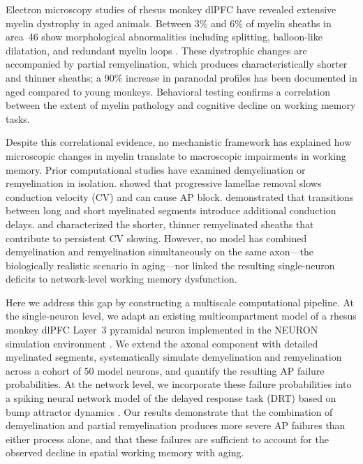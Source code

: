 \documentclass[11pt]{article}
\begin{document}
Electron microscopy studies of rhesus monkey dlPFC have revealed extensive myelin dystrophy in aged animals. Between 3\% and 6\% of myelin sheaths in area~46 show morphological abnormalities including splitting, balloon-like dilatation, and redundant myelin loops \citep{peters2009,bowley2010}. These dystrophic changes are accompanied by partial remyelination, which produces characteristically shorter and thinner sheaths; a 90\% increase in paranodal profiles has been documented in aged compared to young monkeys. Behavioral testing confirms a correlation between the extent of myelin pathology and cognitive decline on working memory tasks.

Despite this correlational evidence, no mechanistic framework has explained how microscopic changes in myelin translate to macroscopic impairments in working memory. Prior computational studies have examined demyelination or remyelination in isolation. \citet{stephanova2005} showed that progressive lamellae removal slows conduction velocity (CV) and can cause AP block. \citet{scurfield2018} demonstrated that transitions between long and short myelinated segments introduce additional conduction delays. \citet{lasiene2008} and \citet{powers2012} characterized the shorter, thinner remyelinated sheaths that contribute to persistent CV slowing. However, no model has combined demyelination and remyelination simultaneously on the same axon---the biologically realistic scenario in aging---nor linked the resulting single-neuron deficits to network-level working memory dysfunction.

Here we address this gap by constructing a multiscale computational pipeline. At the single-neuron level, we adapt an existing multicompartment model of a rhesus monkey dlPFC Layer~3 pyramidal neuron \citep{rumbell2016} implemented in the NEURON simulation environment \citep{hines1997}. We extend the axonal component with detailed myelinated segments, systematically simulate demyelination and remyelination across a cohort of 50 model neurons, and quantify the resulting AP failure probabilities. At the network level, we incorporate these failure probabilities into a spiking neural network model of the delayed response task (DRT) based on bump attractor dynamics \citep{compte2000}. Our results demonstrate that the combination of demyelination and partial remyelination produces more severe AP failures than either process alone, and that these failures are sufficient to account for the observed decline in spatial working memory with aging.
\end{document}

